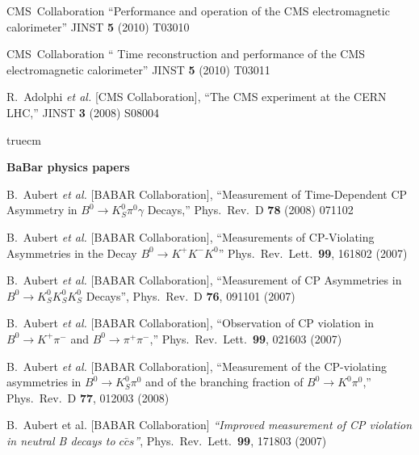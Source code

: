  CMS~Collaboration
 ``Performance and operation of the CMS electromagnetic calorimeter''
 JINST {\bf 5} (2010) T03010

 CMS~Collaboration
 `` Time reconstruction and performance of the CMS electromagnetic calorimeter''
 JINST {\bf 5} (2010) T03011

  R.~Adolphi {\it et al.}  [CMS Collaboration],
  ``The CMS experiment at the CERN LHC,''
  JINST {\bf 3} (2008) S08004





 truecm

{\bf BaBar physics papers}

  B.~Aubert {\it et al.}  [BABAR Collaboration],
  ``Measurement of Time-Dependent CP Asymmetry in $B^0 \to K^0_{S} \pi^0
  \gamma$ Decays,''
  Phys.\ Rev.\  D {\bf 78} (2008) 071102


  B.~Aubert {\it et al.}  [BABAR Collaboration],
  ``Measurements of CP-Violating Asymmetries in the Decay $B^0 \to K^+K^-K^0$''
  Phys.\ Rev.\ Lett.\  {\bf 99}, 161802 (2007)

  B.~Aubert {\it et al.}  [BABAR Collaboration],
  ``Measurement of CP Asymmetries in $B^0 \to K^0_S K^0_S K^0_S$ Decays'',
  Phys.\ Rev.\  D {\bf 76}, 091101 (2007)

  B.~Aubert {\it et al.}  [BABAR Collaboration],
  ``Observation of CP violation in $B^0 \to K^{+} \pi^{-}$ and $B^0 \to \pi^{+} \pi^{-}$,''
  Phys.\ Rev.\ Lett.\  {\bf 99}, 021603 (2007)

  B.~Aubert {\it et al.}  [BABAR Collaboration],
  ``Measurement of the CP-violating asymmetries in $B^0 \to K^0_{S} \pi^0$ and of the branching fraction of $B^0 \to K^0 \pi^0$,''
  Phys.\ Rev.\  D {\bf 77}, 012003 (2008)

  B.~Aubert et al. [BABAR Collaboration] 
  {\it ``Improved measurement of CP violation in neutral B decays to $c \bar{c} s$''},
  Phys.\ Rev.\ Lett.\  {\bf 99}, 171803 (2007)

